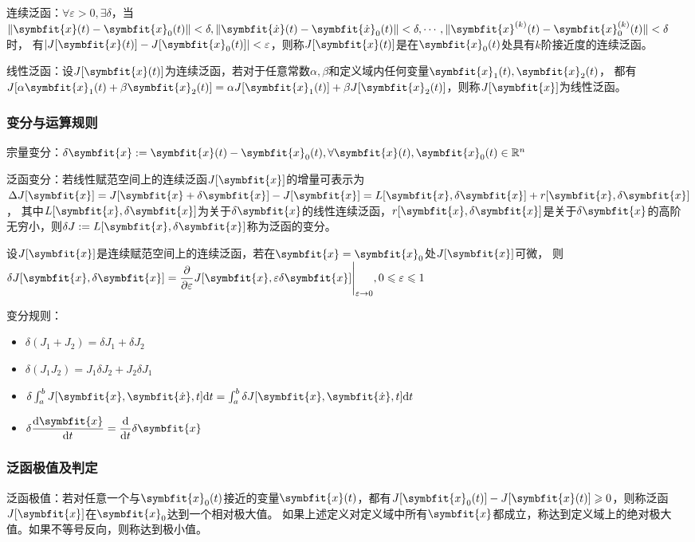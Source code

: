 \documentclass[11pt,a4paper]{ctexart}
\renewcommand{\d}{{\rm d}}
\newcommand{\bm}{\symbfit}
\begin{document}
            连续泛函：$\forall\varepsilon>0,\exists\delta$，当$\|\bm{x}(t)-\bm{x}_0(t)\|<\delta,\|\bm{\dot x}(t)-\bm{\dot x}_0(t)\|<\delta,\cdots,\|\bm{x}^{(k)}(t)-\bm{x}_0^{(k)}(t)\|<\delta$时，
            有$|J[\bm{x}(t)]-J[\bm{x}_0(t)]|<\varepsilon$，则称$J[\bm{x}(t)]$是在$\bm{x}_0(t)$处具有$k$阶接近度的连续泛函。

            线性泛函：设$J[\bm{x}(t)]$为连续泛函，若对于任意常数$\alpha,\beta$和定义域内任何变量$\bm{x}_1(t),\bm{x}_2(t)$，
            都有$J[\alpha\bm{x}_1(t)+\beta\bm{x}_2(t)]=\alpha J[\bm{x}_1(t)]+\beta J[\bm{x}_2(t)]$，则称$J[\bm{x}]$为线性泛函。
        \subsubsection{变分与运算规则}
            宗量变分：$\delta\bm{x}:=\bm{x}(t)-\bm{x}_0(t),\forall\bm{x}(t),\bm{x}_0(t)\in\mathbb{R}^n$

            泛函变分：若线性赋范空间上的连续泛函$J[\bm{x}]$的增量可表示为$\Delta J[\bm{x}]=J[\bm{x}+\delta\bm{x}]-J[\bm{x}]=L[\bm{x},\delta\bm{x}]+r[\bm{x},\delta\bm{x}]$，
            其中$L[\bm{x},\delta\bm{x}]$为关于$\delta\bm{x}$的线性连续泛函，$r[\bm{x},\delta\bm{x}]$是关于$\delta\bm{x}$的高阶无穷小，则$\delta J:=L[\bm{x},\delta\bm{x}]$称为泛函的变分。

            设$J[\bm{x}]$是连续赋范空间上的连续泛函，若在$\bm{x}=\bm{x}_0$处$J[\bm{x}]$可微，
            则$\delta J[\bm{x},\delta\bm{x}]=\dfrac{\partial}{\partial\varepsilon}J[\bm{x},\varepsilon\delta\bm{x}]\Bigg|_{\varepsilon\rightarrow0},0\leqslant\varepsilon\leqslant1$

            变分规则：
            \begin{itemize}
                \item $\delta(J_1+J_2)=\delta J_1+\delta J_2$
                \item $\delta(J_1J_2)=J_1\delta J_2+J_2\delta J_1$
                \item $\delta\int_a^bJ[\bm{x},\bm{\dot x},t]\d t=\int_a^b\delta J[\bm{x},\bm{\dot x},t]\d t$
                \item $\delta\dfrac{\d\bm{x}}{\d t}=\dfrac{\d}{\d t}\delta\bm{x}$
            \end{itemize}
        \subsubsection{泛函极值及判定}
            泛函极值：若对任意一个与$\bm{x}_0(t)$接近的变量$\bm{x}(t)$，都有$J[\bm{x}_0(t)]-J[\bm{x}(t)]\geqslant0$，则称泛函$J[\bm{x}]$在$\bm{x}_0$达到一个相对极大值。
            如果上述定义对定义域中所有$\bm{x}$都成立，称达到定义域上的绝对极大值。如果不等号反向，则称达到极小值。
\end{document}
